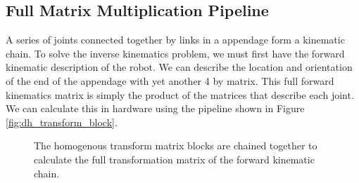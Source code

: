 \subsection{Full Matrix Multiplication Pipeline}

A series of joints connected together by links in a appendage form a kinematic chain. To solve the inverse kinematics problem, we must first have the forward kinematic description of the robot. We can describe the location and orientation of the end of the appendage with yet another 4 by matrix. This full forward kinematics matrix is simply the product of the matrices that describe each joint. We can calculate this in hardware using the pipeline shown in Figure \ref{fig:dh_transform_block}.

\begin{figure}[ht]
\center
{}
\caption{The homogenous transform matrix blocks are chained together to calculate the full transformation matrix of the forward kinematic chain.}
\label{fig:dh_transform_pipeline}
\end{figure}
